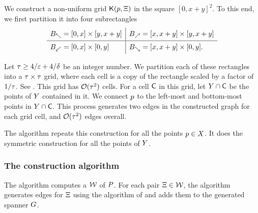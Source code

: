 \documentclass[12pt]{article}%
\begin{document}
We construct a non-uniform grid $\mathsf{K}(p, \Xi)$ in the square
$[0,x+y]^2$.  To this end, we first partition it into four
subrectangles
\begin{equation*}
    \begin{array}{l|l}
      B_\nwarrow = [0,x] \times [y,x+y]
      &
        B_\nearrow = [x,x+y] \times [y,x+y]\Bigr.\\
      \hline
      B_{\swarrow} = [0,x]\times [0,y]
      &
        B_\searrow = [x,x+y] \times [0,y].\Bigr.\\
    \end{array}
\end{equation*}


Let $\tau \geq 4/\varepsilon + 4/\delta$ be an integer number.  We partition each of these rectangles into a
$\tau \times \tau$ grid, where each cell is a copy of the rectangle scaled by a factor of $1/\tau$.  See . This grid has $\mathcal{O}(\tau^2)$
cells. For a cell $\mathsf{C}$ in this grid, let $Y \cap \mathsf{C}$ be the
points of $Y$ contained in it. We connect $p$ to the left-most
and bottom-most points in $Y \cap \mathsf{C}$. This process generates
two edges in the constructed graph for each grid cell, and
$\mathcal{O}( \tau^2)$ edges overall.

The algorithm repeats this construction for all the points
$p \in X$. It does the symmetric construction for all the points
of $Y$.


\subsubsection{The construction algorithm}

The algorithm computes a \QSPD $\mathcal{W}$ of $P$. For each pair
$\Xi \in \mathcal{W}$, the algorithm generates edges for $\Xi$ using the
algorithm of  and adds them to the generated
spanner $G$.
\end{document}
